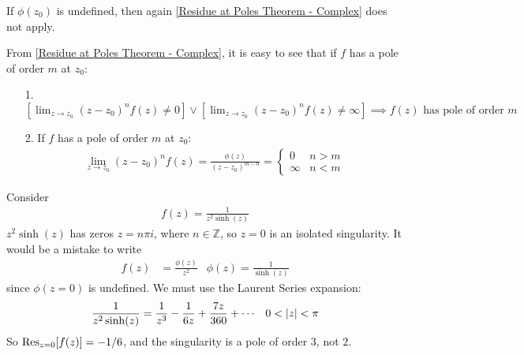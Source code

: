 \documentclass[12pt, english]{book}
\begin{document}
	If \(\phi(z_0)\) is undefined, then again \cref{Residue at Poles Theorem - Complex} does not apply.
	
	From \cref{Residue at Poles Theorem - Complex}, it is easy to see that if \(f\) has a pole of order \(m\) at \(z_0\):
	\begin{itemize}
		\item[1.] \([\lim_{z \rightarrow z_0} (z-z_0)^n f(z) \neq 0] \lor [\lim_{z \rightarrow z_0} (z-z_0)^n f(z) \neq \infty] \implies f(z) \text{ has pole of order } m\)
		\item[2.] If \(f\) has a pole of order \(m\) at \(z_0\):
		\begin{align*}
			\lim_{z\rightarrow z_0} (z-z_0)^n f(z) = \frac{\phi(z)}{(z-z_0)^{m-n}} = 
			\begin{cases}
				0 & n > m \\ \infty & n < m
			\end{cases}
		\end{align*}
	\end{itemize}
	
	\begin{example}
		Consider 
		\begin{align*}
			f(z) = \frac{1}{z^2 \sinh(z)}
		\end{align*}
		\(z^2 \sinh(z)\) has zeros \(z = n \pi i\), where \(n \in \mathbb{Z}\), so \(z = 0\) is an isolated singularity. It would be a mistake to write
		\begin{align*}
			f(z) &= \frac{\phi(z)}{z^2} & \phi(z) = \frac{1}{\sinh(z)}
		\end{align*}
		since \(\phi(z=0)\) is undefined. We must use the Laurent Series expansion:
		\begin{align*}
			\frac{1}{z^2 \sinh(z)} &= \frac{1}{z^3} - \frac{1}{6z} + \frac{7z}{360} + \cdots
				& 0 < \abs{z} < \pi
		\end{align*}
		So \(\Res_{z=0}[f(z)] = -1/6\), and the singularity is a pole of order \(3\), not \(2\).
	\end{example}
\end{document}
